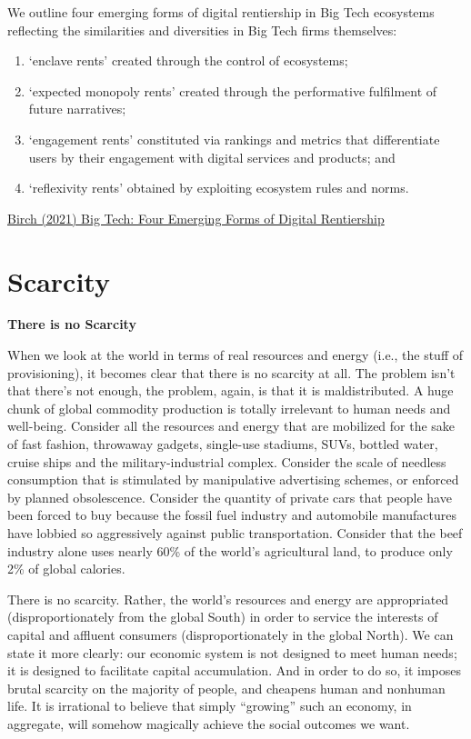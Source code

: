 \documentclass[
]{book}
\begin{document}
We outline four emerging forms of digital rentiership in Big Tech ecosystems reflecting the similarities and diversities in Big Tech firms themselves:

\begin{enumerate}
\def\labelenumi{(\arabic{enumi})}
\item
  `enclave rents' created through the control of ecosystems;
\item
  `expected monopoly rents' created through the performative fulfilment of future narratives;
\item
  `engagement rents' constituted via rankings and metrics that differentiate users by their engagement with digital services and products; and
\item
  `reflexivity rents' obtained by exploiting ecosystem rules and norms.
\end{enumerate}

\href{https://www.tandfonline.com/doi/full/10.1080/09505431.2021.1932794}{Birch (2021) Big Tech: Four Emerging Forms of Digital Rentiership}

\hypertarget{scarcity}{%
\chapter{Scarcity}\label{scarcity}}

\textbf{There is no Scarcity}

When we look at the world in terms of real resources and energy (i.e., the stuff of provisioning), it becomes clear that there is no scarcity at all. The problem isn't that there's not enough, the problem, again, is that it is maldistributed. A huge chunk of global commodity production is totally irrelevant to human needs and well-being. Consider all the resources and energy that are mobilized for the sake of fast fashion, throwaway gadgets, single-use stadiums, SUVs, bottled water, cruise ships and the military-industrial complex. Consider the scale of needless consumption that is stimulated by manipulative advertising schemes, or enforced by planned obsolescence. Consider the quantity of private cars that people have been forced to buy because the fossil fuel industry and automobile manufactures have lobbied so aggressively against public transportation. Consider that the beef industry alone uses nearly 60\% of the world's agricultural land, to produce only 2\% of global calories.

There is no scarcity. Rather, the world's resources and energy are appropriated (disproportionately from the global South) in order to service the interests of capital and affluent consumers (disproportionately in the global North). We can state it more clearly: our economic system is not designed to meet human needs; it is designed to facilitate capital accumulation. And in order to do so, it imposes brutal scarcity on the majority of people, and cheapens human and nonhuman life. It is irrational to believe that simply ``growing'' such an economy, in aggregate, will somehow magically achieve the social outcomes we want.
\end{document}
